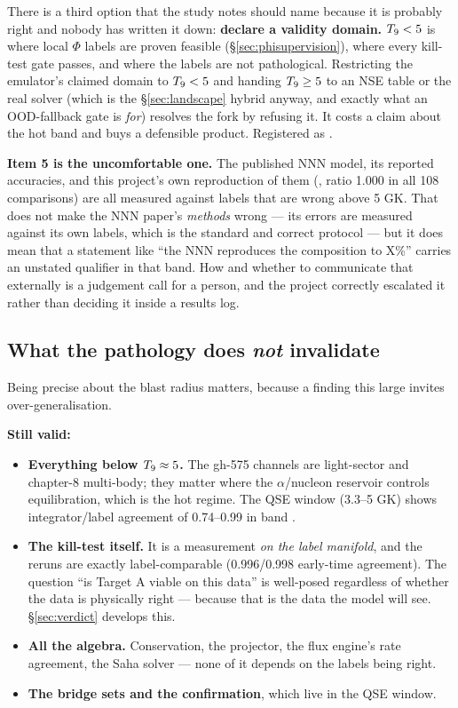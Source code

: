 There is a third option that the study notes should name because it is
probably right and nobody has written it down: \textbf{declare a validity
domain.} $T_{9} < 5$ is where local $\Phi$ labels are proven feasible
(\S\ref{sec:phisupervision}), where every kill-test gate passes, and where the
labels are not pathological. Restricting the emulator's claimed domain to
$T_{9} < 5$ and handing $T_{9} \ge 5$ to an NSE table or the real solver (which is
the \S\ref{sec:landscape} hybrid anyway, and exactly what an OOD-fallback gate
is \emph{for}) resolves the fork by refusing it. It costs a claim about the hot
band and buys a defensible product. Registered as .

\textbf{Item 5 is the uncomfortable one.} The published NNN model, its reported
accuracies, and this project's own reproduction of them
(, ratio 1.000 in all 108 comparisons) are all measured
against labels that are wrong above 5 GK. That does not make the NNN paper's
\emph{methods} wrong --- its errors are measured against its own labels, which
is the standard and correct protocol --- but it does mean that a statement like
``the NNN reproduces the composition to X\%'' carries an unstated qualifier in
that band. How and whether to communicate that externally is a judgement call
for a person, and the project correctly escalated it rather than deciding it
inside a results log.

\subsection{What the pathology does \emph{not} invalidate}
\label{sec:notinvalidated}

Being precise about the blast radius matters, because a finding this large
invites over-generalisation.

\textbf{Still valid:}

\begin{itemize}
\item \textbf{Everything below $T_{9} \approx 5$.} The gh-575 channels are
  light-sector and chapter-8 multi-body; they matter where the
  $\alpha$/nucleon reservoir controls equilibration, which is the hot regime.
  The QSE window (3.3--5 GK) shows integrator/label agreement of 0.74--0.99 in
  band .
\item \textbf{The kill-test itself.} It is a measurement \emph{on the label
  manifold}, and the reruns are exactly label-comparable (0.996/0.998
  early-time agreement). The question ``is Target A viable on this data'' is
  well-posed regardless of whether the data is physically right --- because
  that is the data the model will see. \S\ref{sec:verdict} develops this.
\item \textbf{All the algebra.} Conservation, the projector, the flux engine's
  rate agreement, the Saha solver --- none of it depends on the labels being
  right.
\item \textbf{The bridge sets and the  confirmation}, which live
  in the QSE window.
\end{itemize}

